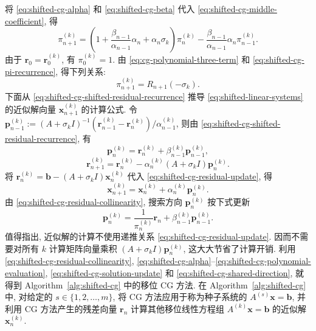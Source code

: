 {将 \eqref{eq:shifted-cg-alpha} 和 \eqref{eq:shifted-cg-beta} 代入 \eqref{eq:shifted-cg-middle-coefficient}, 得}
\begin{equation}\label{eq:shifted-cg-pi-recurrence}\pi_{n+1}^{(k)}=\left(1+\frac{\beta_{n-1}}{\alpha_{n-1}}\alpha_n+\alpha_n\sigma_k\right)\pi_n^{(k)}-\frac{\beta_{n-1}}{\alpha_{n-1}}\alpha_n\pi_{n-1}^{(k)}.\end{equation}
{由于 $\bm r_0=\bm r_0^{(k)}$, 有 $\pi_0^{(k)}=1$. 由 \eqref{eq:cg-polynomial-three-term} 和 \eqref{eq:shifted-cg-pi-recurrence}, 得下列关系:}
\begin{equation}\label{eq:shifted-cg-polynomial-evaluation}\pi_{n+1}^{(k)}=R_{n+1}(-\sigma_k).\end{equation}
{下面从 \eqref{eq:shifted-cg-shifted-residual-recurrence} 推导 \eqref{eq:shifted-linear-systems} 的近似解向量 $\bm x_{n+1}^{(k)}$ 的计算公式. 令 $\bm p_{n-1}^{(k)}:=(A+\sigma_k I)^{-1}(\bm r_{n-1}^{(k)}-\bm r_n^{(k)})/\alpha_{n-1}^{(k)}$, 则由 \eqref{eq:shifted-cg-shifted-residual-recurrence}, 有}
\begin{equation}\label{eq:shifted-cg-direction-recurrence}\bm p_n^{(k)}=\bm r_n^{(k)}+\beta_{n-1}^{(k)}\bm p_{n-1}^{(k)},\end{equation}
\begin{equation}\label{eq:shifted-cg-residual-update}\bm r_{n+1}^{(k)}=\bm r_n^{(k)}-\alpha_n^{(k)}(A+\sigma_k I)\bm p_n^{(k)}.\end{equation}
{将 $\bm r_n^{(k)}=\bm b-(A+\sigma_k I)\bm x_n^{(k)}$ 代入 \eqref{eq:shifted-cg-residual-update}, 得}
\begin{equation}\label{eq:shifted-cg-solution-update}\bm x_{n+1}^{(k)}=\bm x_n^{(k)}+\alpha_n^{(k)}\bm p_n^{(k)}.\end{equation}
{由 \eqref{eq:shifted-cg-residual-collinearity}, 搜索方向 $\bm p_n^{(k)}$ 按下式更新}
\begin{equation}\label{eq:shifted-cg-shared-direction}\bm p_n^{(k)}=\frac1{\pi_n^{(k)}}\bm r_n+\beta_{n-1}^{(k)}\bm p_{n-1}^{(k)}.\end{equation}
{值得指出, 近似解的计算不使用递推关系 \eqref{eq:shifted-cg-residual-update}. 因而不需要对所有 $k$ 计算矩阵向量乘积 $(A+\sigma_k I)\bm p_n^{(k)}$, 这大大节省了计算开销.}
{利用 \eqref{eq:shifted-cg-residual-collinearity}, \eqref{eq:shifted-cg-alpha}--\eqref{eq:shifted-cg-polynomial-evaluation}, \eqref{eq:shifted-cg-solution-update} 和 \eqref{eq:shifted-cg-shared-direction}, 就得到 Algorithm\ \ref{alg:shifted-cg} 中的移位 CG 方法. 在 Algorithm\ \ref{alg:shifted-cg} 中, 对给定的 $s\in\{1,2,\ldots,m\}$, 将 CG 方法应用于称为种子系统的 $A^{(s)}\bm x=\bm b$, 并利用 CG 方法产生的残差向量 $\bm r_n$ 计算其他移位线性方程组 $A^{(k)}\bm x=\bm b$ 的近似解 $\bm x_n^{(k)}$.}
